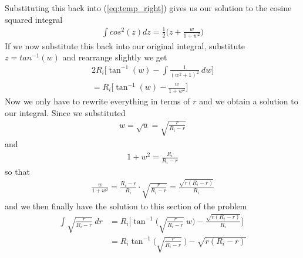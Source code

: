 \documentclass{article}
\begin{document}
Substituting this back into (\ref{eq:temp_right}) gives us our solution to the cosine squared integral
\begin{align}
    \int cos^2(z) dz = \frac{1}{2} \bigl(z + \frac{w}{1+w^2}\bigr)
\end{align}
If we now substitute this back into our original integral, substitute $z = tan^{-1}(w)$ and rearrange slightly we get
\begin{align}
    2R_i \Biggl[ \tan^{-1}(w) - \int \frac{1}{(w^2 + 1)^2} ~dw \Biggr]\\
    = R_i \Biggl[ \tan^{-1}(w) - \frac{w}{1+w^2}\Biggr]
\end{align}
Now we only have to rewrite everything in terms of $r$ and we obtain a solution to our integral. Since
we substituted
\begin{align}
    w = \sqrt{u} = \sqrt{\frac{r}{R_i - r}}
\end{align}
and
\begin{align}
    {1+w^2} = \frac{R_i}{R_i - r} 
\end{align}
so that
\begin{align}
    \frac{w}{1+w^2} = \frac{R_i - r}{R_i} \cdot \sqrt{\frac{r}{R_i-r}} = \frac{\sqrt{r( R_i - r)}}{R_i} 
\end{align}
and we then finally have the solution to this section of the problem
\begin{align}
    \int \sqrt{\frac{r}{R_i - r}} ~ dr &= R_i \Biggl[ \tan^{-1}\biggl(\sqrt{\frac{r}{R_i - r}}~w\biggr) - \frac{\sqrt{r( R_i - r)}}{R_i}  \Biggr]\\
    &= R_i \tan^{-1}\biggl(\sqrt{\frac{r}{R_i - r}} ~ \biggr) -\sqrt{r( R_i - r)}
\end{align}
\end{document}
